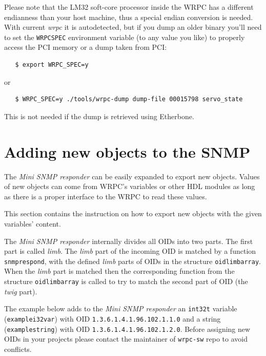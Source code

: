 \documentclass[a4paper, 12pt]{article}
\renewcommand{\_}{\underscore\allowbreak}
\begin{document}
Please note that the LM32 soft-core processor inside the WRPC has a different
endianness than your host machine, thus a special endian conversion is needed.
With current \textit{wrpc} it is autodetected, but if you dump an older binary
you'll need to set the
\texttt{WRPC\_SPEC} environment variable (to any value you like) to properly
access the PCI memory or a dump taken from PCI:
\begin{lstlisting}
   $ export WRPC_SPEC=y
\end{lstlisting}
or
\begin{lstlisting}
   $ WRPC_SPEC=y ./tools/wrpc-dump dump-file 00015798 servo_state
\end{lstlisting}
This is not needed if the dump is retrieved using Etherbone.

\newpage
\section{Adding new objects to the SNMP}
\label{appendix:adding_new_objects_to_the_SNMP}

The \textit{Mini SNMP responder} can be easily expanded to export new objects.
Values of new objects can come from WRPC's variables or other HDL modules
as long as there is a proper interface to the WRPC to read these values.

This section contains the instruction on how to export new objects with
the given variables' content.

The \textit{Mini SNMP responder} internally divides all OIDs into two parts.
The first part is called \textit{limb}. The \textit{limb} part of the incoming OID is
matched by a function \texttt{snmp\_respond}, with the defined \textit{limb} parts of OIDs
in the structure \texttt{oid\_limb\_array}.
When the \textit{limb} part is matched then the corresponding function from
the structure \texttt{oid\_limb\_array} is called to try to match the second part of
OID (the \textit{twig} part).

\begin{sloppypar} %
The example below adds to the \textit{Mini SNMP responder} an \texttt{int32\_t} variable
(\texttt{example\_i32var}) with OID \texttt{1.3.6.1.4.1.96.102.1.1.0} and a string
(\texttt{example\_string}) with OID \texttt{1.3.6.1.4.1.96.102.1.2.0}.
Before assigning new OIDs in your projects please contact the maintainer of
\texttt{wrpc-sw} repo to avoid conflicts.
\end{sloppypar}
\end{document}
